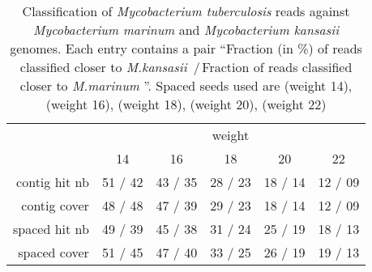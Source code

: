 \begin{table}
\caption{Classification of {\em Mycobacterium tuberculosis} reads
  against {\em Mycobacterium marinum} and {\em Mycobacterium kansasii} genomes. Each entry contains a pair ``Fraction (in \%) of reads
  classified closer to {\em M.kansasii}\, /\,Fraction of reads
  classified closer to {\em M.marinum} ''. Spaced seeds used are
  	\SHAPE{\#\#-\#\#---\#-\#-\#-\#\#-\#\#--\#\#\#} (weight 14),
        \SHAPE{\#\#-\#\#\#---\#-\#-\#-\#\#-\#\#--\#\#\#\#} (weight 16),
        \SHAPE{\#\#\#-\#--\#\#\#-\#\#--\#-\#--\#\#\#-\#\#\#\#} (weight 18),
        \SHAPE{\#\#\#\#\#--\#-\#\#-\#-\#\#--\#\#-\#-\#\#\#-\#\#\#} (weight 20),
        \SHAPE{\#\#\#\#\#-\#\#\#--\#\#\#--\#-\#-\#\#-\#\#-\#\#\#\#\#} (weight 22)
\label{kan_mar_tub}}
\centering
\begin{tabular}{|r|c|c|c|c|c|}
\hline
& \multicolumn{5}{c|}{weight}\\
\cline{2-6}
                        & 14                  & 16                   & 18                   & 20                   & 22\\
\hline
  contig hit nb     & 51 / 42 & 43 / 35 & 28 / 23 & 18 / 14 & 12 / 09\\
  contig cover  & 48 / 48 & 47 / 39 & 29 / 23 & 18 / 14 & 12 / 09\\
\hline
  spaced hit nb    & 49 / 39 & 45 / 38 & 31 / 24 & 25 / 19 & 18 / 13\\
  spaced cover & 51 / 45 & 47 / 40 & 33 / 25 & 26 / 19 & 19 / 13\\
\hline
\end{tabular}
\end{table}
